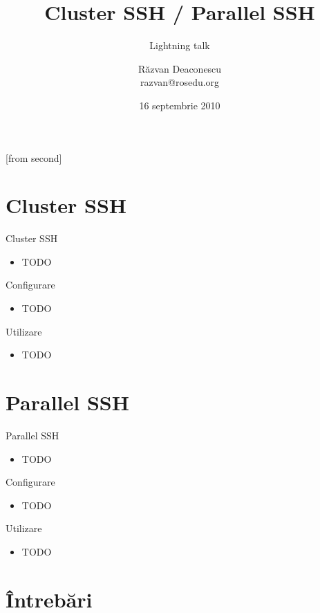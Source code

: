 \documentclass{beamer}
\title[Cluster SSH / Parallel SSH]{Cluster SSH / Parallel SSH}
\subtitle{Lightning talk}
\institute{Întâlnirile lunare RLUG -- Septembrie 2010}
\author[Răzvan Deaconescu]{Răzvan Deaconescu\\
	razvan@rosedu.org}
\date{16 septembrie 2010}
\begin{document}
[from second]


\frame{\titlepage}

\section{Cluster SSH}

\frame{\tableofcontents[currentsection]}

\begin{frame}{Cluster SSH}
	\begin{itemize}		%
		\item TODO
	\end{itemize}
\end{frame}

\begin{frame}{Configurare}
	\begin{itemize}
		\item TODO
	\end{itemize}
\end{frame}

\begin{frame}{Utilizare}
	\begin{itemize}
		\item TODO
	\end{itemize}
\end{frame}

\section{Parallel SSH}

\frame{\tableofcontents[currentsection]}

\begin{frame}{Parallel SSH}
	\begin{itemize}
		\item TODO
	\end{itemize}
\end{frame}

\begin{frame}{Configurare}
	\begin{itemize}
		\item TODO
	\end{itemize}
\end{frame}

\begin{frame}{Utilizare}
	\begin{itemize}
		\item TODO
	\end{itemize}
\end{frame}

\section{Întrebări}

\frame{\tableofcontents[currentsection]}
\end{document}
